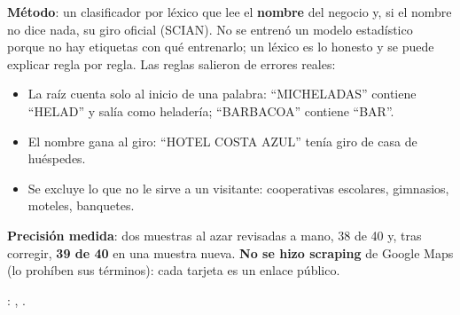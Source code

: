 \textbf{Método}: un clasificador por léxico que lee el \textbf{nombre} del negocio y, si el nombre no dice nada, su giro
oficial (SCIAN). No se entrenó un modelo estadístico porque no hay etiquetas con qué entrenarlo; un léxico es lo honesto y
se puede explicar regla por regla. Las reglas salieron de errores reales:
\begin{itemize}
\item La raíz cuenta solo al inicio de una palabra: ``MICHELADAS'' contiene ``HELAD'' y salía como heladería;
  ``BARBACOA'' contiene ``BAR''.
\item El nombre gana al giro: ``HOTEL COSTA AZUL'' tenía giro de casa de huéspedes.
\item Se excluye lo que no le sirve a un visitante: cooperativas escolares, gimnasios, moteles, banquetes.
\end{itemize}
\textbf{Precisión medida}: dos muestras al azar revisadas a mano, 38 de 40 y, tras corregir, \textbf{39 de 40} en una
muestra nueva. \textbf{No se hizo scraping} de Google Maps (lo prohíben sus términos): cada tarjeta es un enlace público.

\begin{codigoen}: , .\end{codigoen}
